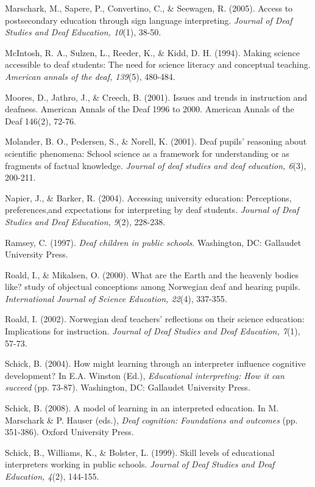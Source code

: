 \documentclass[11.5pt]{sig-alternate} %
\begin{document}
Marschark, M., Sapere, P., Convertino, C., \& Seewagen, R. (2005). Access to postsecondary education through sign language interpreting. \textit{Journal of Deaf Studies and Deaf Education, 10}(1), 38-50.

McIntosh, R. A., Sulzen, L., Reeder, K., \& Kidd, D. H. (1994). Making science accessible to deaf students: The need for science literacy and conceptual teaching. \textit{American annals of the deaf, 139}(5), 480-484.

Moores, D., Jathro, J., \& Creech, B. (2001). Issues and trends in instruction and deafness. American Annals of the Deaf 1996 to 2000. American Annals of the Deaf 146(2), 72-76.

Molander, B. O., Pedersen, S., \& Norell, K. (2001). Deaf pupils' reasoning about scientific phenomena: School science as a framework for understanding or as fragments of factual knowledge. \textit{Journal of deaf studies and deaf education, 6}(3), 200-211.

Napier, J., \& Barker, R. (2004). Accessing university education: Perceptions, preferences,and expectations for interpreting by deaf students. \textit{Journal of Deaf Studies and Deaf Education, 9}(2), 228-238.

Ramsey, C. (1997). \textit{Deaf children in public schools}. Washington, DC: Gallaudet University Press.

Roald, I., \& Mikalsen, O. (2000). What are the Earth and the heavenly bodies like? study of objectual conceptions among Norwegian deaf and hearing pupils. \textit{International Journal of Science Education, 22}(4), 337-355.

Roald, I. (2002). Norwegian deaf teachers’ reflections on their science education: Implications for instruction. \textit{Journal of Deaf Studies and Deaf Education, 7}(1), 57-73.

Schick, B. (2004). How might learning through an interpreter influence cognitive 	development? In E.A. Winston (Ed.), \textit{Educational interpreting: How it can succeed} (pp. 73-87). Washington, DC: Gallaudet University Press.

Schick, B. (2008). A model of learning in an interpreted education. In M. Marschark \& P. Hauser (eds.), \textit{Deaf cognition:  Foundations and outcomes} (pp. 351-386). Oxford University Press.

Schick, B., Williams, K., \& Bolster, L. (1999). Skill levels of educational interpreters working in public schools. \textit{Journal of Deaf Studies and Deaf Education, 4}(2), 144-155.
\end{document}
